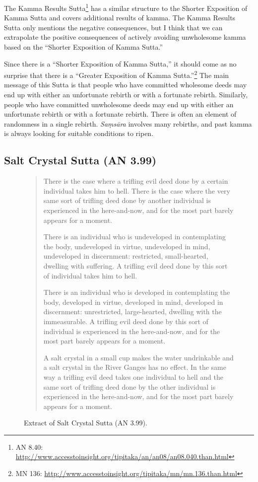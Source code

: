 The Kamma Results Sutta\footnote{AN 8.40: \url{http://www.accesstoinsight.org/tipitaka/an/an08/an08.040.than.html}} has a similar structure to the Shorter Exposition of Kamma Sutta and covers additional results of kamma. The Kamma Results Sutta only mentions the negative consequences, but I think that we can extrapolate the positive consequences of actively avoiding unwholesome kamma based on the “Shorter Exposition of Kamma Sutta.”

Since there is a “Shorter Exposition of Kamma Sutta,” it should come as no surprise that there is a “Greater Exposition of Kamma Sutta.”\footnote{MN 136: \url{http://www.accesstoinsight.org/tipitaka/mn/mn.136.than.html}} The main message of this Sutta is that people who have committed wholesome deeds may end up with either an unfortunate rebirth or with a fortunate rebirth. Similarly, people who have committed unwholesome deeds may end up with either an unfortunate rebirth or with a fortunate rebirth. There is often an element of randomness in a single rebirth. \textit{Saṃsāra} involves many rebirths, and past kamma is always looking for suitable conditions to ripen.

\subsection*{Salt Crystal Sutta (AN 3.99)}

\begin{figure}[H]
\begin{quotation}
There is the case where a trifling evil deed done by a certain individual takes him to hell. There is the case where the very same sort of trifling deed done by another individual is experienced in the here-and-now, and for the most part barely appears for a moment.

There is an individual who is undeveloped in contemplating the body, undeveloped in virtue, undeveloped in mind, undeveloped in discernment: restricted, small-hearted, dwelling with suffering. A trifling evil deed done by this sort of individual takes him to hell.

There is an individual who is developed in contemplating the body, developed in virtue, developed in mind, developed in discernment: unrestricted, large-hearted, dwelling with the immeasurable. A trifling evil deed done by this sort of individual is experienced in the here-and-now, and for the most part barely appears for a moment. 

A salt crystal in a small cup makes the water undrinkable and a salt crystal in the River Ganges has no effect. In the same way a trifling evil deed takes one individual to hell and the same sort of trifling deed done by the other individual is experienced in the here-and-now, and for the most part barely appears for a moment.
\end{quotation}
\caption{Extract of Salt Crystal Sutta (AN 3.99).}
\label{fig:AN3}
\end{figure}

